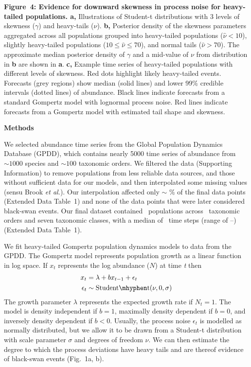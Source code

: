 \textbf{Figure~4: Evidence for downward skewness in process noise for heavy-tailed populations. a,} Illustrations of Student-t distributions with 3 levels of skewness (\(\gamma\)) and heavy-tails (\(\nu\)). \textbf{b,} Posterior density of the skewness parameters aggregated across all populations grouped into heavy-tailed populations (\(\hat{\nu} < 10\)), slightly heavy-tailed populations (\(10 \leq \hat{\nu} \leq 70\)), and normal tails (\(\hat{\nu} > 70\)). The approximate median posterior density of \(\gamma\) and a mid-value of \(\nu\) from distribution in \textbf{b} are shown in \textbf{a}. \textbf{c,} Example time series of heavy-tailed populations with different levels of skewness. Red dots highlight likely heavy-tailed events. Forecasts (grey regions) show median (solid lines) and lower 99\% credible intervals (dotted lines) of abundance. Black lines indicate forecasts from a standard Gompertz model with lognormal process noise. Red lines indicate forecasts from a Gompertz model with estimated tail shape and skewness.

\clearpage

\textbf{Methods}

We selected abundance time series from the Global Population Dynamics Database\cite{gpdd2010} (GPDD), which contains nearly 5000 time series of abundance from \(\sim 1000\) species and \(\sim 100\) taxonomic orders. We filtered the data (Supporting Information) to remove populations from less reliable data sources, and those without sufficient data for our models, and then interpolated some missing values (sensu Brook \textit{et al.}\cite{brook2006a}). Our interpolation affected only \(\sim\) \interpPointsPerc \% of the final data points (Extended Data Table~1) and none of the data points that were later considered black-swan events. Our final dataset contained \NPops\ populations across \NOrders\
taxonomic orders and seven taxonomic classes, with a median of \medianTimeSteps\ time steps (range of \minTimeSteps--\maxTimeSteps) (Extended Data Table~1).

We fit heavy-tailed Gompertz population dynamics models to data from the GPDD. The Gompertz model represents population growth as a linear function in log space. If \(x_{t}\) represents the log abundance (\(N\)) at time \emph{t} then
\begin{align}
x_t &= \lambda + bx_{t - 1} + \epsilon_t\\
\epsilon_t &\sim \mathrm{Student\mhyphen t}(\nu, 0, \sigma)
\end{align}
The growth parameter \(\lambda\) represents the expected growth rate if \(N_{t} = 1\). The model is density independent if \(b = 1\), maximally density dependent if \(b = 0\), and inversely density dependent if \(b < 0\). Usually, the process noise \(\epsilon_{t}\) is modelled as normally distributed, but we allow it to be drawn from a Student-t distribution with scale parameter \(\sigma\) and degrees of freedom \(\nu\). We can then estimate the degree to which the process deviations have heavy tails and are thereof evidence of black-swan events (Fig.~1a, b).

